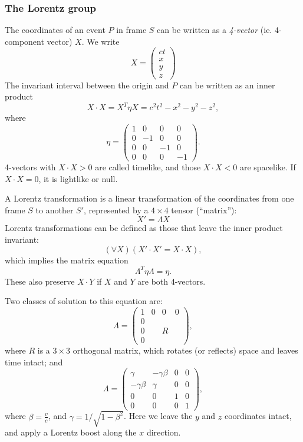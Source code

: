 \documentclass[a4paper]{article}
\begin{document}
\subsubsection*{The Lorentz group}
The coordinates of an event $P$ in frame $S$ can be written as a \emph{4-vector} (ie. 4-component vector) $X$. We write
\[
  X =
  \begin{pmatrix}
    ct\\
    x\\
    y\\
    z
  \end{pmatrix}
\]
The invariant interval between the origin and $P$ can be written as an inner product
\[
  X\cdot X = X^T\eta X = c^2t^2 - x^2 - y^2 - z^2,
\]
where
\[
  \eta =
  \begin{pmatrix}
    1 & 0 & 0 & 0\\
    0 & -1 & 0 & 0\\
    0 & 0 & -1 & 0\\
    0 & 0 & 0 & -1
  \end{pmatrix}.
\]
4-vectors with $X\cdot X > 0$ are called timelike, and those $X \cdot X < 0$ are spacelike. If $X\cdot X = 0$, it is lightlike or null.

A Lorentz transformation is a linear transformation of the coordinates from one frame $S$ to another $S'$, represented by a $4\times 4$ tensor (``matrix''):
\[
  X' = \Lambda X
\]
Lorentz transformations can be defined as those that leave the inner product invariant:
\[
  (\forall X)(X'\cdot X' = X\cdot X),
\]
which implies the matrix equation
\[
  \Lambda^T\eta \Lambda = \eta.\tag{$*$}
\]
These also preserve $X\cdot Y$ if $X$ and $Y$ are both 4-vectors.

Two classes of solution to this equation are:
\[
  \Lambda =
  \begin{pmatrix}
    1 & 0 & 0 & 0\\
    0\\
    0 & & R\\
    0
  \end{pmatrix},
\]
where $R$ is a $3\times 3$ orthogonal matrix, which rotates (or reflects) space and leaves time intact; and
\[
  \Lambda =
  \begin{pmatrix}
    \gamma & -\gamma \beta & 0 & 0\\
    -\gamma\beta & \gamma & 0 & 0\\
    0 & 0 & 1 & 0\\
    0 & 0 & 0 & 1
  \end{pmatrix},
\]
where $\beta = \frac{v}{c}$, and $\gamma = 1/\sqrt{1 - \beta^2}$. Here we leave the $y$ and $z$ coordinates intact, and apply a Lorentz boost along the $x$ direction.
\end{document}
